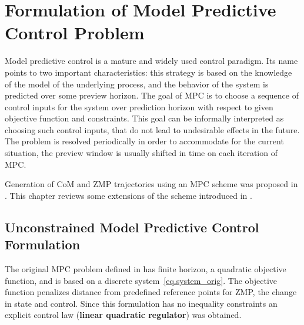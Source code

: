 \chapter{Formulation of Model Predictive Control Problem}
\label{ch.MPC}
Model predictive control \cite{MacMPC} is a mature and widely used control 
paradigm. Its name points to two important characteristics: this strategy
is based on the knowledge of the model of the underlying process, and the behavior
of the system is predicted over some preview horizon. The goal of \ac{MPC} is to
choose a sequence of control inputs for the system over prediction horizon with
respect to given objective function and constraints. This goal can be informally
interpreted as choosing such control inputs, that do not lead to undesirable 
effects in the future. The problem is resolved periodically in order to 
accommodate for the current situation, the preview window is usually shifted in 
time on each iteration of \ac{MPC}. 

Generation of \ac{CoM} and \ac{ZMP} trajectories using an \ac{MPC} scheme was
proposed in \cite{LIPM-MPC}. This chapter reviews some extensions of the scheme
introduced in \cite{WieberMPC, dimitrov2011sparse}.



\section{Unconstrained Model Predictive Control Formulation}
The original \ac{MPC} problem defined in \cite{LIPM-MPC} has finite horizon, a 
quadratic objective function, and is based on a discrete system~\eqref{eq.system_orig}. 
The objective function penalizes distance from predefined reference points for \ac{ZMP}, 
the change in state and control. Since this formulation has no inequality constraints 
an explicit control law ({\bf linear quadratic regulator}) was obtained.

